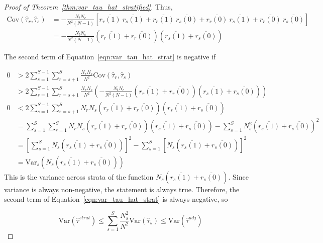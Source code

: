 \documentclass[12pt]{article}
\newcommand{\var}{\textrm{Var}}
\newcommand{\cov}{\textrm{Cov}}
\begin{document}
\begin{proof}[Proof of Theorem~\ref{thm:var_tau_hat_stratified}]
\noindent Thus,
\begin{align*}
\cov(\hat{\tau}_r, \hat{\tau}_s) &= -\frac{N_tN_c}{N^2(N-1)} \left[\overline{r_r(1)}~\overline{r_s(1)} + \overline{r_r(1)}~\overline{r_s(0)} + \overline{r_r(0)}~\overline{r_s(1)} + \overline{r_r(0)}~\overline{r_s(0)} \right]
\\
&=  -\frac{N_tN_c}{N^2(N-1)} \left( \overline{r_r(1)} + \overline{r_r(0)}\right)\left(\overline{r_s(1)} + \overline{r_s(0)}\right)
\end{align*}

\noindent The second term of Equation~\ref{eqn:var_tau_hat_strat} is negative if

\begin{align*}
0 &> 2\sum_{s=1}^{S-1}\sum_{r=s+1}^S \frac{N_rN_s}{N^2}\cov(\hat{\tau}_r, \hat{\tau}_s) \\
&> 2\sum_{s=1}^{S-1}\sum_{r=s+1}^S \frac{N_rN_s}{N^2} \left(  -\frac{N_tN_c}{N^2(N-1)} \left( \overline{r_r(1)} + \overline{r_r(0)}\right)\left(\overline{r_s(1)} + \overline{r_s(0)}\right)\right) \\
0 &< 2\sum_{s=1}^{S-1}\sum_{r=s+1}^S N_rN_s  \left( \overline{r_r(1)} + \overline{r_r(0)}\right)\left(\overline{r_s(1)} + \overline{r_s(0)}\right) \\
&= \sum_{s=1}^S\sum_{r = 1}^S N_rN_s  \left( \overline{r_r(1)} + \overline{r_r(0)}\right)\left(\overline{r_s(1)} + \overline{r_s(0)}\right) - \sum_{s=1}^S N_s^2\left(\overline{r_s(1)} + \overline{r_s(0)}\right)^2 \\
&= \left[ \sum_{s=1}^S N_s\left(\overline{r_s(1)} + \overline{r_s(0)}\right)\right]^2 - \sum_{s=1}^S \left[ N_s\left(\overline{r_s(1)} + \overline{r_s(0)}\right)\right]^2 \\
&= \var_s \left( N_s\left(\overline{r_s(1)} + \overline{r_s(0)}\right) \right)
\end{align*}
This is the variance across strata of the function $N_s\left(\overline{r_s(1)} + \overline{r_s(0)}\right)$.
Since variance is always non-negative, the statement is always true.
Therefore, the second term of Equation~\ref{eqn:var_tau_hat_strat} is always negative, so

$$\var\left(\hat{\tau}^{strat}\right) \leq \sum_{s=1}^S \frac{N_s^2}{N^2} \var(\hat{\tau}_s) \leq \var(\hat{\tau}^{adj})$$





\end{proof}





\end{document}
